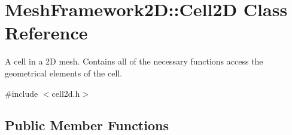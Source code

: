 \hypertarget{classMeshFramework2D_1_1Cell2D}{}\section{Mesh\+Framework2D\+:\+:Cell2D Class Reference}
\label{classMeshFramework2D_1_1Cell2D}


A cell in a 2D mesh. Contains all of the necessary functions access the geometrical elements of the cell.  




{\ttfamily \#include $<$cell2d.\+h$>$}

\subsection*{Public Member Functions}
